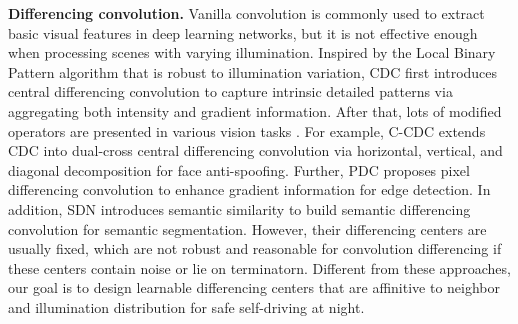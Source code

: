 \documentclass{article}
\begin{document}
\textbf{Differencing convolution.} 
Vanilla convolution is commonly used to extract basic visual features in deep
learning networks, but it is not effective enough when processing scenes with varying illumination. Inspired by the Local Binary Pattern algorithm \cite{ojala1994performance,boulkenafet2015face} that is robust to illumination variation, CDC \cite{yu2020searching} first introduces central differencing convolution to capture intrinsic detailed patterns via aggregating both intensity and gradient information. After that, lots of modified operators are presented in various vision tasks \cite{yu2020fas,su2021pixel,cao2023deep,chen2023dea,tan2022semantic}. For example, C-CDC \cite{yu2021dual} extends CDC into dual-cross central differencing convolution via horizontal, vertical, and diagonal decomposition for face anti-spoofing. Further, PDC \cite{su2021pixel} proposes pixel differencing convolution to enhance gradient information for edge detection. In addition, SDN \cite{tan2022semantic} introduces semantic similarity to build semantic differencing convolution for semantic segmentation. However, their differencing centers are usually fixed, which are not robust and reasonable for convolution differencing if these centers contain noise or lie on terminatorn. Different from these approaches, our goal is to design learnable differencing centers that are affinitive to neighbor and illumination distribution for safe self-driving at night. 
\end{document}
